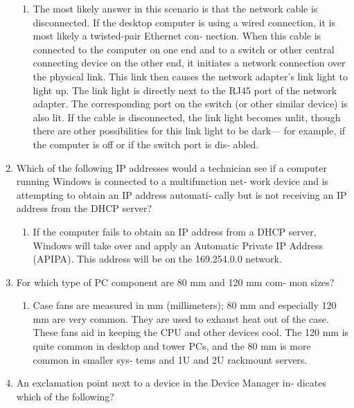 \documentclass{article}
\begin{document}
\begin{enumerate}
    \begin{enumerate}
        \item The	most	likely	answer	in	this	scenario	is	that	the
network	cable	is	disconnected.	If	the	desktop	computer	is	using	a
wired	connection,	it	is	most	likely	a	twisted-pair	Ethernet	con‐
nection.	When	this	cable	is	connected	to	the	computer	on	one	end
and	to	a	switch	or	other	central	connecting	device	on	the	other
end,	it	initiates	a	network	connection	over	the	physical	link.	This
link	then	causes	the	network	adapter’s	link	light	to	light	up.	The
link	light	is	directly	next	to	the	RJ45	port	of	the	network	adapter.
The	corresponding	port	on	the	switch	(or	other	similar	device)	is
also	lit.	If	the	cable	is	disconnected,	the	link	light	becomes	unlit,
though	there	are	other	possibilities	for	this	link	light	to	be	dark—
for	example,	if	the	computer	is	off	or	if	the	switch	port	is	dis‐
abled.

    \end{enumerate}
    \item Which	of	the	following	IP	addresses	would	a	technician	see	if	a
computer	running	Windows	is	connected	to	a	multifunction	net‐
work	device	and	is	attempting	to	obtain	an	IP	address	automati‐
cally	but	is	not	receiving	an	IP	address	from	the	DHCP	server?

    \begin{enumerate}
        \item If	the	computer	fails	to	obtain	an	IP	address	from	a
DHCP	server,	Windows	will	take	over	and	apply	an	Automatic
Private	IP	Address	(APIPA).	This	address	will	be	on	the
169.254.0.0	network.

    \end{enumerate}
    \item For	which	type	of	PC	component	are	80	mm	and	120	mm	com‐
mon	sizes?

    \begin{enumerate}
        \item Case	fans	are	measured	in	mm	(millimeters);	80
mm	and	especially	120	mm	are	very	common.	They	are	used	to
exhaust	heat	out	of	the	case.	These	fans	aid	in	keeping	the	CPU
and	other	devices	cool.	The	120	mm	is	quite	common	in	desktop
and	tower	PCs,	and	the	80	mm	is	more	common	in	smaller	sys‐
tems	and	1U	and	2U	rackmount	servers.

    \end{enumerate}
    \item An	exclamation	point	next	to	a	device	in	the	Device	Manager	in‐
dicates	which	of	the	following?


\end{enumerate}
\end{document}
